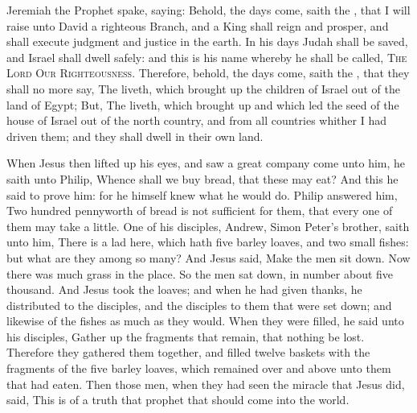  Jeremiah the Prophet spake, saying: Behold, the days come, saith the , that I will raise unto David a righteous Branch, and a King shall reign and prosper, and shall execute judgment and justice in the earth. In his days Judah shall be saved, and Israel shall dwell safely: and this is his name whereby he shall be called, \textsc{The Lord Our Righteousness}. Therefore, behold, the days come, saith the , that they shall no more say, The  liveth, which brought up the children of Israel out of the land of Egypt; But, The  liveth, which brought up and which led the seed of the house of Israel out of the north country, and from all countries whither I had driven them; and they shall dwell in their own land.



 When Jesus then lifted up his eyes, and saw a great company come unto him, he saith unto Philip, Whence shall we buy bread, that these may eat? And this he said to prove him: for he himself knew what he would do. Philip answered him, Two hundred pennyworth of bread is not sufficient for them, that every one of them may take a little. One of his disciples, Andrew, Simon Peter's brother, saith unto him, There is a lad here, which hath five barley loaves, and two small fishes: but what are they among so many? And Jesus said, Make the men sit down. Now there was much grass in the place. So the men sat down, in number about five thousand. And Jesus took the loaves; and when he had given thanks, he distributed to the disciples, and the disciples to them that were set down; and likewise of the fishes as much as they would. When they were filled, he said unto his disciples, Gather up the fragments that remain, that nothing be lost. Therefore they gathered them together, and filled twelve baskets with the fragments of the five barley loaves, which remained over and above unto them that had eaten. Then those men, when they had seen the miracle that Jesus did, said, This is of a truth that prophet that should come into the world.



